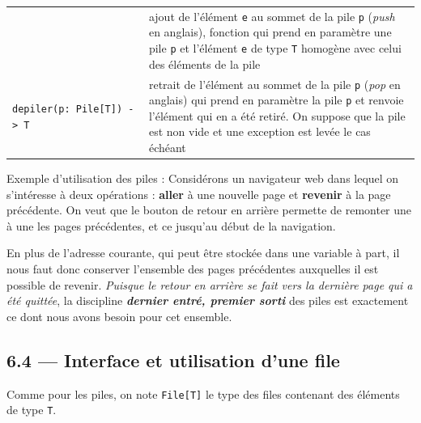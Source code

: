 \documentclass[a4paper,17pt]{extarticle}
\begin{document}
\begin{longtable}[]{@{}ll@{}}
\begin{minipage}[t]{0.47\columnwidth}
\end{minipage} & \begin{minipage}[t]{0.47\columnwidth}\raggedright
ajout de l'élément \texttt{e} au sommet de la pile \texttt{p}
(\emph{push} en anglais), fonction qui prend en paramètre une pile
\texttt{p} et l'élément \texttt{e} de type \texttt{T} homogène avec
celui des éléments de la pile\strut
\end{minipage}\tabularnewline
\begin{minipage}[t]{0.47\columnwidth}\raggedright
\texttt{depiler(p:\ Pile{[}T{]})\ -\textgreater{}\ T}\strut
\end{minipage} & \begin{minipage}[t]{0.47\columnwidth}\raggedright
retrait de l'élément au sommet de la pile \texttt{p} (\emph{pop} en
anglais) qui prend en paramètre la pile \texttt{p} et renvoie l'élément
qui en a été retiré. On suppose que la pile est non vide et une
exception est levée le cas échéant\strut
\end{minipage}\tabularnewline
\bottomrule
\end{longtable}

    Exemple d'utilisation des piles : Considérons un navigateur web dans
lequel on s'intéresse à deux opérations : \textbf{aller} à une nouvelle
page et \textbf{revenir} à la page précédente. On veut que le bouton de
retour en arrière permette de remonter une à une les pages précédentes,
et ce jusqu'au début de la navigation.

En plus de l'adresse courante, qui peut être stockée dans une variable à
part, il nous faut donc conserver l'ensemble des pages précédentes
auxquelles il est possible de revenir. \emph{Puisque le retour en
arrière se fait vers la dernière page qui a été quittée}, la discipline
\textbf{\emph{dernier entré, premier sorti}} des piles est exactement ce
dont nous avons besoin pour cet ensemble.

    \hypertarget{interface-et-utilisation-dune-file}{%
\subsection{6.4 --- Interface et utilisation d'une
file}\label{interface-et-utilisation-dune-file}}

    Comme pour les piles, on note \texttt{File{[}T{]}} le type des files
contenant des éléments de type \texttt{T}.
\end{document}
